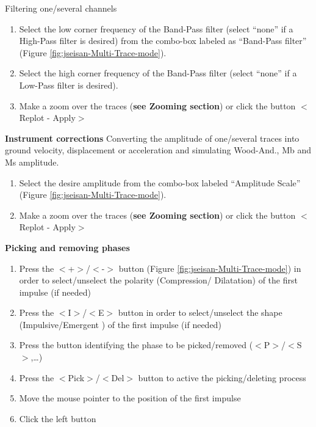 Filtering one/several channels 
\begin{enumerate}
\item Select the low corner frequency of the Band-Pass filter (select ``none'' if a High-Pass filter is desired) from the combo-box labeled as ``Band-Pass filter'' 
(Figure \ref{fig:jseisan-Multi-Trace-mode}).  
\item Select the high corner frequency of the Band-Pass filter (select ``none'' if  a Low-Pass filter is desired). 
\item Make a zoom over the traces (\textbf{see Zooming section}) or click the button $<$Replot - Apply$>$ 
\end{enumerate}

\textbf{Instrument corrections}\newline
Converting the amplitude of one/several traces into ground velocity, displacement or acceleration and simulating Wood-And., Mb and Ms amplitude. 

\begin{enumerate}
\item Select the desire amplitude from the combo-box labeled  ``Amplitude Scale'' 
(Figure \ref{fig:jseisan-Multi-Trace-mode}). 
\item Make a zoom over the traces (\textbf{see Zooming section}) or click the button $<$Replot - Apply$>$ 
\end{enumerate}

\textbf{Picking and removing phases}\newline
{} 
\begin{enumerate}
\item
 Press the $<$+$>$/$<$-$>$ button (Figure \ref{fig:jseisan-Multi-Trace-mode}) 
in order to select/unselect the polarity (Compression/ Dilatation) of the first impulse (if needed) 
\item Press the $<$I$>$/$<$E$>$ button in order to select/unselect the shape (Impulsive/Emergent ) of the first impulse (if needed) 
\item Press the button identifying the phase to be picked/removed ($<$P$>$/$<$S$>$,\dots ) 
\item Press the $<$Pick$>$/$<$Del$>$ button to active the picking/deleting process 
\item Move the mouse pointer to the position of the first impulse 
\item Click the left button 
\end{enumerate}


